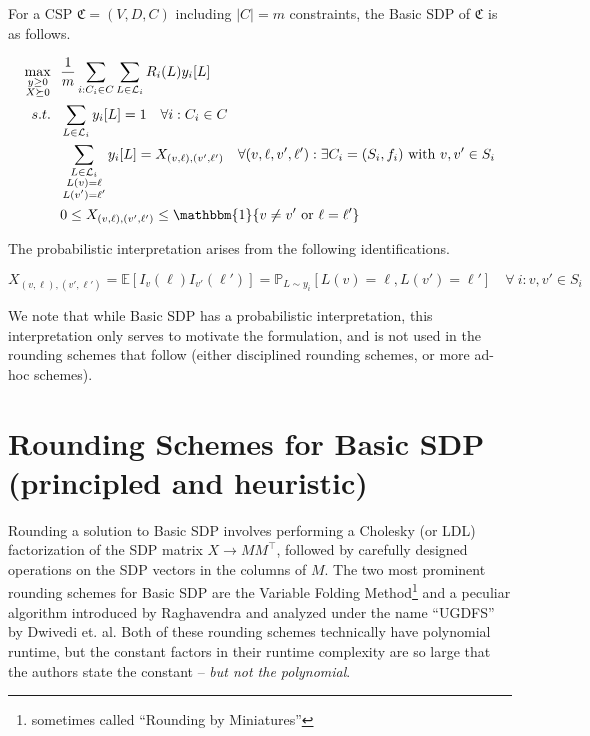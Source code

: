 \documentclass[12pt]{article} %
\begin{document}
For a CSP $\mathfrak{C} = (V,D,C)$ including $|C| = m$ constraints, the Basic SDP of $\mathfrak{C}$ is as follows.

\begin{align}
\operatorname*{max}_{\substack{y \geq 0 \\  X \succeq 0}} ~ & ~ \frac{1}{m}\sum\limits_{i:C_i\in C} \sum\limits_{L\in \mathcal{L}_i} R_i(L)y_i[L]  \nonumber  \\
s.t. ~ & ~ \sum\limits_{L \in \mathcal{L}_i} y_i[L] = 1  \quad \forall i : C_i \in C \\
& ~ \sum\limits_{\substack{L \in \mathcal{L}_i \\ L(v)=\ell \\ L(v')=\ell '}} y_i[L] = X_{(v,\ell),(v',\ell')}  \quad \forall (v,\ell,v',\ell') : \exists C_i = (S_i, f_i) \text{ with } v,v' \in S_i \\
& ~ 0 \leq  X_{(v,\ell),(v',\ell')}  \leq \mathbbm{1}\{ v \neq v' \text{ or } \ell = \ell' \}
\end{align}

The probabilistic interpretation arises from the following identifications.

\begin{equation}
X_{(v,\ell),(v',\ell')} = \mathbb{E}[I_v(\ell)I_{v'}(\ell')] = \mathbb{P}_{L\sim y_i}[L(v)=\ell, L(v')=\ell'] \quad \forall ~ i : v,v' \in S_i
\end{equation}

We note that while Basic SDP has a probabilistic interpretation, this interpretation only serves to motivate the formulation, and is not used in the rounding schemes that follow (either disciplined rounding schemes, or more ad-hoc schemes).

\section{Rounding Schemes for Basic SDP (principled and heuristic)}

Rounding a solution to Basic SDP involves performing a Cholesky (or LDL) factorization of the SDP matrix $X \rightarrow MM^{\intercal} $, followed by carefully designed operations on the SDP vectors in the columns of $M$. The two most prominent rounding schemes for Basic SDP are the Variable Folding Method\footnote{sometimes called ``Rounding by Miniatures''} \cite{raghavendra2009round} and a peculiar algorithm introduced by Raghavendra \citep{raghavendra2008optimal} and analyzed under the name ``UGDFS'' by Dwivedi et. al\cite{dwivedi2015introduction}. Both of these rounding schemes technically have polynomial runtime, but the constant factors in their runtime complexity are so large that the authors state the constant -- \textit{but not the polynomial}.
\end{document}
